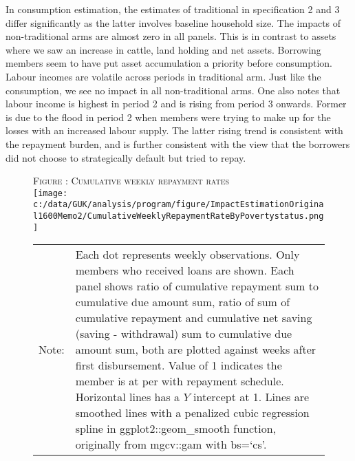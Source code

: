 	In consumption estimation, the estimates of \textsf{traditional} in specification 2 and 3 differ significantly as the latter involves baseline household size. The impacts of non-\textsf{traditional} arms are almost zero in all panels. This is in contrast to assets where we saw an increase in cattle, land holding and net assets. Borrowing members seem to have put asset accumulation a priority before consumption. Labour incomes are volatile across periods in \textsf{traditional} arm. Just like the consumption, we see no impact in all non-\textsf{traditional} arms. One also notes that labour income is highest in period 2 and is rising from period 3 onwards. Former is due to the flood in period 2 when members were trying to make up for the losses with an increased labour supply. The latter rising trend is consistent with the repayment burden, and is further consistent with the view that the borrowers did not choose to strategically default but tried to repay. 
	

\begin{figure}
\hfil\textsc{\footnotesize Figure \thefigure: Cumulative weekly repayment rates\label{fig weeklysavingrepayrate}}\\
\hfil\texttt{[image: c:/data/GUK/analysis/program/figure/ImpactEstimationOriginal1600Memo2/CumulativeWeeklyRepaymentRateByPovertystatus.png]}\\
\renewcommand{\arraystretch}{1}
\hfil\begin{tabular}{>{\hfill\scriptsize}p{1cm}<{}>{\scriptsize}p{12cm}<{\hfill}}
Note:& Each dot represents weekly observations. Only members who received loans are shown. Each panel shows ratio of cumulative repayment sum to cumulative due amount sum, ratio of sum of cumulative repayment and cumulative net saving (saving - withdrawal) sum to cumulative due amount sum, both are plotted against weeks after first disbursement. Value of 1 indicates the member is at per with repayment schedule. Horizontal lines has a $Y$ intercept at 1. Lines are smoothed lines with a penalized cubic regression spline in \textsf{ggplot2::geom\_smooth} function, originally from \textsf{mgcv::gam} with \textsf{bs=`cs'}. \\[-1ex]
\end{tabular}
\end{figure}


